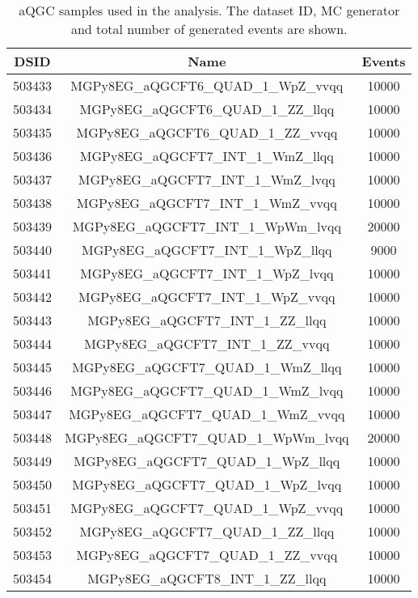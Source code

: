 \begin{table}[!htbp]
\begin{center}
\small
\caption{
aQGC samples used in the analysis. The dataset ID, MC generator and total number of generated events are shown.
}
\begin{tabular}{c|c|c}
\hline

\hline
DSID & Name & Events  \\
\hline

503433 & MGPy8EG\_aQGCFT6\_QUAD\_1\_WpZ\_vvqq    & 10000 \\
503434 & MGPy8EG\_aQGCFT6\_QUAD\_1\_ZZ\_llqq     & 10000 \\
503435 & MGPy8EG\_aQGCFT6\_QUAD\_1\_ZZ\_vvqq     & 10000 \\
503436 & MGPy8EG\_aQGCFT7\_INT\_1\_WmZ\_llqq     & 10000 \\
503437 & MGPy8EG\_aQGCFT7\_INT\_1\_WmZ\_lvqq     & 10000 \\
503438 & MGPy8EG\_aQGCFT7\_INT\_1\_WmZ\_vvqq     & 10000 \\
503439 & MGPy8EG\_aQGCFT7\_INT\_1\_WpWm\_lvqq    & 20000 \\
503440 & MGPy8EG\_aQGCFT7\_INT\_1\_WpZ\_llqq     & 9000 \\
503441 & MGPy8EG\_aQGCFT7\_INT\_1\_WpZ\_lvqq     & 10000 \\
503442 & MGPy8EG\_aQGCFT7\_INT\_1\_WpZ\_vvqq     & 10000 \\
503443 & MGPy8EG\_aQGCFT7\_INT\_1\_ZZ\_llqq      & 10000 \\
503444 & MGPy8EG\_aQGCFT7\_INT\_1\_ZZ\_vvqq      & 10000 \\
503445 & MGPy8EG\_aQGCFT7\_QUAD\_1\_WmZ\_llqq    & 10000 \\
503446 & MGPy8EG\_aQGCFT7\_QUAD\_1\_WmZ\_lvqq    & 10000 \\
503447 & MGPy8EG\_aQGCFT7\_QUAD\_1\_WmZ\_vvqq    & 10000 \\
503448 & MGPy8EG\_aQGCFT7\_QUAD\_1\_WpWm\_lvqq   & 20000 \\
503449 & MGPy8EG\_aQGCFT7\_QUAD\_1\_WpZ\_llqq    & 10000 \\
503450 & MGPy8EG\_aQGCFT7\_QUAD\_1\_WpZ\_lvqq    & 10000 \\
503451 & MGPy8EG\_aQGCFT7\_QUAD\_1\_WpZ\_vvqq    & 10000 \\
503452 & MGPy8EG\_aQGCFT7\_QUAD\_1\_ZZ\_llqq     & 10000 \\
503453 & MGPy8EG\_aQGCFT7\_QUAD\_1\_ZZ\_vvqq     & 10000 \\
503454 & MGPy8EG\_aQGCFT8\_INT\_1\_ZZ\_llqq      & 10000 \\

\end{tabular}
\end{center}
\end{table}
